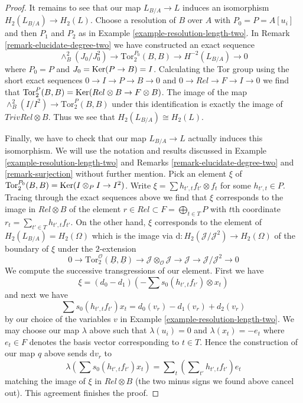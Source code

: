 \begin{proof}
\medskip\noindent
It remains to see that our map $L_{B/A} \to L$ induces an isomorphism
$H_2(L_{B/A}) \to H_2(L)$. Choose a resolution of $B$ over $A$ with
$P_0 = P = A[u_i]$ and then $P_1$ and $P_2$ as in
Example \ref{example-resolution-length-two}.
In Remark \ref{remark-elucidate-degree-two} we have constructed an exact
sequence
$$
\wedge^2_B(J_0/J_0^2) \to \text{Tor}_2^{P_0}(B, B) \to H^{-2}(L_{B/A}) \to 0
$$
where $P_0 = P$ and $J_0 = \mathop{\mathrm{Ker}}(P \to B) = I$.
Calculating the Tor group using the short exact sequences
$0 \to I \to P \to B \to 0$ and $0 \to Rel \to F \to I \to 0$
we find that
$\text{Tor}_2^P(B, B) = \mathop{\mathrm{Ker}}(Rel \otimes B \to F \otimes B)$.
The image of the map $\wedge^2_B(I/I^2) \to \text{Tor}_2^P(B, B)$
under this identification is exactly the image of $TrivRel \otimes B$.
Thus we see that $H_2(L_{B/A}) \cong H_2(L)$.

\medskip\noindent
Finally, we have to check that our map $L_{B/A} \to L$ actually induces
this isomorphism. We will use the notation and results discussed in
Example \ref{example-resolution-length-two} and
Remarks \ref{remark-elucidate-degree-two} and \ref{remark-surjection}
without further mention. Pick an element $\xi$ of
$\text{Tor}_2^{P_0}(B, B) = \mathop{\mathrm{Ker}}(I \otimes_P I \to I^2)$.
Write $\xi = \sum h_{t', t}f_{t'} \otimes f_t$ for some
$h_{t', t} \in P$. Tracing through the exact sequences above we
find that $\xi$ corresponds to the image in $Rel \otimes B$
of the element $r \in Rel \subset F = \bigoplus_{t \in T} P$ with
$t$th coordinate $r_t = \sum_{t' \in T} h_{t', t}f_{t'}$.
On the other hand, $\xi$ corresponds to the element of
$H_2(L_{B/A}) = H_2(\Omega)$ which is the image
via $\text{d} : H_2(\mathcal{J}/\mathcal{J}^2) \to H_2(\Omega)$
of the boundary of $\xi$ under the $2$-extension
$$
0 \to
\text{Tor}_2^\mathcal{O}(\underline{B}, \underline{B})
\to 
\mathcal{J} \otimes_\mathcal{O} \mathcal{J} \to \mathcal{J}
\to
\mathcal{J}/\mathcal{J}^2 \to 0
$$
We compute the successive transgressions of our element. First we have
$$
\xi = (d_0 - d_1)(- \sum s_0(h_{t', t} f_{t'}) \otimes x_t)
$$
and next we have
$$
\sum s_0(h_{t', t} f_{t'}) x_t = d_0(v_r) - d_1(v_r) + d_2(v_r)
$$
by our choice of the variables $v$ in
Example \ref{example-resolution-length-two}.
We may choose our map $\lambda$ above such that
$\lambda(u_i) = 0$ and $\lambda(x_t) = - e_t$ where $e_t \in F$
denotes the basis vector corresponding to $t \in T$.
Hence the construction of our map $q$ above sends $\text{d}v_r$ to
$$
\lambda(\sum s_0(h_{t', t} f_{t'}) x_t) =
\sum\nolimits_t \left(\sum\nolimits_{t'} h_{t', t}f_{t'}\right) e_t
$$
matching the image of $\xi$ in $Rel \otimes B$ (the two minus signs
we found above cancel out). This agreement finishes the proof.
\end{proof}

